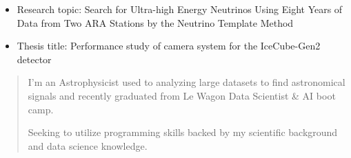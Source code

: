 \documentclass[10pt,a4paper,ragged2e,withhyper]{altacv}
\begin{document}
\begin{paracol}{2}
\begin{itemize}
\item Research topic: Search for Ultra-high Energy Neutrinos Using Eight Years of Data from Two ARA Stations by the Neutrino Template Method
\end{itemize}
\divider

\begin{itemize}
\item Thesis title: Performance study of camera system for the IceCube-Gen2 detector
\end{itemize}
\divider


\switchcolumn


\begin{quote}
I'm an Astrophysicist used to analyzing large datasets to find astronomical signals and recently graduated from Le Wagon Data Scientist \& AI boot camp. 

Seeking to utilize programming skills backed by my scientific background and data science knowledge.
\end{quote}


\\
\\

\dividerv\smallskip

\\

\dividerv\smallskip

\\
\\

\dividerv\smallskip


\end{paracol}
\end{document}
